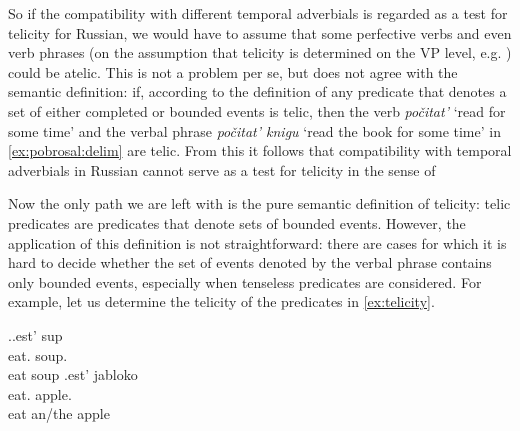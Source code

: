 So if the compatibility with different temporal adverbials is regarded as a test for telicity for Russian, we would have to assume that some perfective verbs and even verb phrases (on the assumption that telicity is determined on the VP level, e.g. \citealt{Borer:05}) could be atelic. This is not a problem per se, but does not agree with the semantic definition: if, according to the definition of \citet[3]{Rothstein:08a} any predicate that denotes a set of either completed or bounded events is telic, then the verb \textit{po\v{c}itat'} `read for some time' and the verbal phrase \textit{po\v{c}itat' knigu} `read the book for some time' in \ref{ex:pobrosal:delim} are telic. From this it follows that compatibility with temporal adverbials in Russian cannot serve as a test for telicity in the sense of \citet{Rothstein:08a}




Now the only path we are left with is the pure semantic definition of telicity: telic predicates are predicates that denote sets of bounded events. However, the application of this definition is not straightforward: there are cases for which it is hard to decide whether the set of events denoted by the verbal phrase contains only bounded events, especially when tenseless predicates are considered. For example, let us determine the telicity of the predicates in \ref{ex:telicity}.

\ex.\label{ex:telicity}\ag.\label{ex:telicity:soup}est' sup\\
eat. soup.\\
eat soup
\bg.\label{ex:telicity:apple}est' jabloko\\
eat. apple.\\
eat an/the apple

